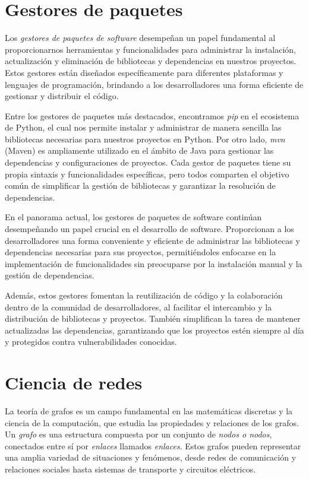 \section{Gestores de paquetes}

Los \textit{gestores de paquetes de software} desempeñan un papel fundamental al proporcionarnos
herramientas y funcionalidades para administrar la instalación, actualización y eliminación de
bibliotecas y dependencias en nuestros proyectos. Estos gestores están diseñados específicamente
para diferentes plataformas y lenguajes de programación, brindando a los desarrolladores una forma
eficiente de gestionar y distribuir el código.

Entre los gestores de paquetes más destacados, encontramos \textit{pip} en el ecosistema de Python,
el cual nos permite instalar y administrar de manera sencilla las bibliotecas necesarias para
nuestros proyectos en Python. Por otro lado, \textit{mvn} (Maven) es ampliamente utilizado en el
ámbito de Java para gestionar las dependencias y configuraciones de proyectos. Cada gestor de paquetes
tiene su propia sintaxis y funcionalidades específicas, pero todos comparten el objetivo común de
simplificar la gestión de bibliotecas y garantizar la resolución de dependencias.

En el panorama actual, los gestores de paquetes de software continúan desempeñando un papel
crucial en el desarrollo de software. Proporcionan a los desarrolladores una forma conveniente
y eficiente de administrar las bibliotecas y dependencias necesarias para sus proyectos, permitiéndoles
enfocarse en la implementación de funcionalidades sin preocuparse por la instalación manual y la
gestión de dependencias.

Además, estos gestores fomentan la reutilización de código y la colaboración dentro de la comunidad de desarrolladores, al facilitar el intercambio y la distribución de bibliotecas y proyectos. También simplifican la tarea de mantener actualizadas las dependencias, garantizando que los proyectos estén siempre al día y protegidos contra vulnerabilidades conocidas.


\section{Ciencia de redes}

La teoría de grafos es un campo fundamental en las matemáticas discretas y la ciencia de la computación,
que estudia las propiedades y relaciones de los grafos. Un \textit{grafo} es una estructura compuesta
por un conjunto de \textit{nodos o nodos}, conectados entre sí por \textit{enlaces} llamados \textit{enlaces}.
Estos grafos pueden representar una amplia variedad de situaciones y fenómenos, desde redes de
comunicación y relaciones sociales hasta sistemas de transporte y circuitos eléctricos.

